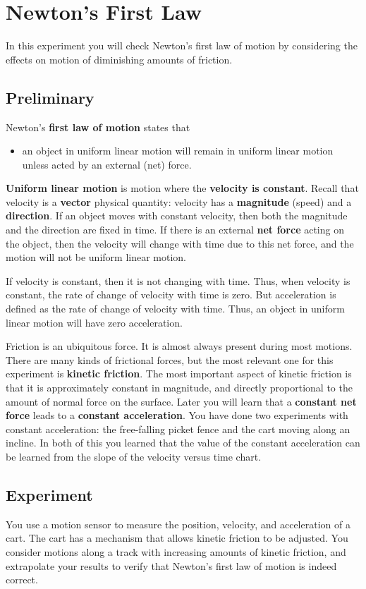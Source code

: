 \setcounter{chapter}{2}
\chapter{Newton's First Law}
%
In this experiment you will check Newton's first law of motion by considering the effects on motion of diminishing amounts of friction.
%
\section{Preliminary}
%
Newton's \textbf{first law of motion} states that
\begin{itemize}
    \item an object in uniform linear motion will remain in uniform linear motion unless acted by an external (net) force.
\end{itemize}
\textbf{Uniform linear motion} is motion where the \textbf{velocity is constant}. Recall that velocity is a \textbf{vector} physical quantity: velocity has a \textbf{magnitude} (speed) and a \textbf{direction}. If an object moves with constant velocity, then both the magnitude and the direction are fixed in time. If there is an external \textbf{net force} acting on the object, then the velocity will change with time due to this net force, and the motion will not be uniform linear motion.

If velocity is constant, then it is not changing with time. Thus, when velocity is constant, the rate of change of velocity with time is zero. But acceleration is defined as the rate of change of velocity with time. Thus, an object in uniform linear motion will have zero acceleration.

Friction is an ubiquitous force. It is almost always present during most motions. There are many kinds of frictional forces, but the most relevant one for this experiment is \textbf{kinetic friction}. The most important aspect of kinetic friction is that it is approximately constant in magnitude, and directly proportional to the amount of normal force on the surface. Later you will learn that a \textbf{constant net force} leads to a \textbf{constant acceleration}. You have done two experiments with constant acceleration: the free-falling picket fence and the cart moving along an incline. In both of this you learned that the value of the constant acceleration can be learned from the slope of the velocity versus time chart.
%
\section{Experiment}
%
You use a motion sensor to measure the position, velocity, and acceleration of a cart. The cart has a mechanism that allows kinetic friction to be adjusted. You consider motions along a track with increasing amounts of kinetic friction, and extrapolate your results to verify that Newton's first law of motion is indeed correct.
%
